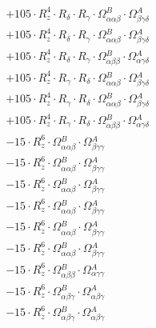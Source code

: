 \documentclass{article}
\begin{document}
\begin{subequations}
\begin{gather}
\begin{array}{c}
 \\[0.2em] 		 + 105 \cdot R_{z}^{4} \cdot R_{\delta{}} \cdot R_{\gamma{}} \cdot \Omega{}^{B}_{\alpha{}\alpha{}\beta{}} \cdot \Omega{}^{A}_{\beta{}\gamma{}\delta{}} 
 \\[0.2em] 		 + 105 \cdot R_{z}^{4} \cdot R_{\delta{}} \cdot R_{\gamma{}} \cdot \Omega{}^{B}_{\alpha{}\alpha{}\beta{}} \cdot \Omega{}^{A}_{\beta{}\gamma{}\delta{}} 
 \\[0.2em] 		 + 105 \cdot R_{z}^{4} \cdot R_{\delta{}} \cdot R_{\gamma{}} \cdot \Omega{}^{B}_{\alpha{}\beta{}\beta{}} \cdot \Omega{}^{A}_{\alpha{}\gamma{}\delta{}} 
 \\[0.2em] 		 + 105 \cdot R_{z}^{4} \cdot R_{\gamma{}} \cdot R_{\delta{}} \cdot \Omega{}^{B}_{\alpha{}\alpha{}\beta{}} \cdot \Omega{}^{A}_{\beta{}\gamma{}\delta{}} 
 \\[0.2em] 		 + 105 \cdot R_{z}^{4} \cdot R_{\gamma{}} \cdot R_{\delta{}} \cdot \Omega{}^{B}_{\alpha{}\alpha{}\beta{}} \cdot \Omega{}^{A}_{\beta{}\gamma{}\delta{}} 
 \\[0.2em] 		 + 105 \cdot R_{z}^{4} \cdot R_{\gamma{}} \cdot R_{\delta{}} \cdot \Omega{}^{B}_{\alpha{}\beta{}\beta{}} \cdot \Omega{}^{A}_{\alpha{}\gamma{}\delta{}} 
 \\[0.2em] 		 - 15 \cdot R_{z}^{6} \cdot \Omega{}^{B}_{\alpha{}\alpha{}\beta{}} \cdot \Omega{}^{A}_{\beta{}\gamma{}\gamma{}} 
 \\[0.2em] 		 - 15 \cdot R_{z}^{6} \cdot \Omega{}^{B}_{\alpha{}\alpha{}\beta{}} \cdot \Omega{}^{A}_{\beta{}\gamma{}\gamma{}} 
 \\[0.2em] 		 - 15 \cdot R_{z}^{6} \cdot \Omega{}^{B}_{\alpha{}\alpha{}\beta{}} \cdot \Omega{}^{A}_{\beta{}\gamma{}\gamma{}} 
 \\[0.2em] 		 - 15 \cdot R_{z}^{6} \cdot \Omega{}^{B}_{\alpha{}\alpha{}\beta{}} \cdot \Omega{}^{A}_{\beta{}\gamma{}\gamma{}} 
 \\[0.2em] 		 - 15 \cdot R_{z}^{6} \cdot \Omega{}^{B}_{\alpha{}\alpha{}\beta{}} \cdot \Omega{}^{A}_{\beta{}\gamma{}\gamma{}} 
 \\[0.2em] 		 - 15 \cdot R_{z}^{6} \cdot \Omega{}^{B}_{\alpha{}\alpha{}\beta{}} \cdot \Omega{}^{A}_{\beta{}\gamma{}\gamma{}} 
 \\[0.2em] 		 - 15 \cdot R_{z}^{6} \cdot \Omega{}^{B}_{\alpha{}\beta{}\beta{}} \cdot \Omega{}^{A}_{\alpha{}\gamma{}\gamma{}} 
 \\[0.2em] 		 - 15 \cdot R_{z}^{6} \cdot \Omega{}^{B}_{\alpha{}\beta{}\gamma{}} \cdot \Omega{}^{A}_{\alpha{}\beta{}\gamma{}} 
 \\[0.2em] 		 - 15 \cdot R_{z}^{6} \cdot \Omega{}^{B}_{\alpha{}\beta{}\gamma{}} \cdot \Omega{}^{A}_{\alpha{}\beta{}\gamma{}} 

\end{array}
\end{gather}
\end{subequations}
\end{document}
